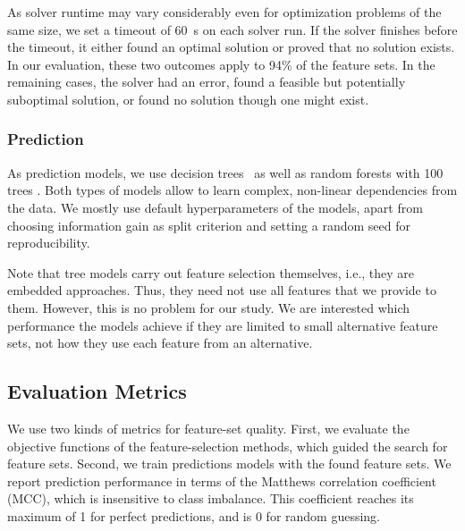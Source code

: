 \documentclass[conference]{IEEEtran}
\theoremstyle{definition}
\begin{document}
As solver runtime may vary considerably even for optimization problems of the same size, we set a timeout of 60~s on each solver run.
If the solver finishes before the timeout, it either found an optimal solution or proved that no solution exists.
In our evaluation, these two outcomes apply to 94\% of the feature sets.
In the remaining cases, the solver had an error, found a feasible but potentially suboptimal solution, or found no solution though one might exist.


\subsubsection{Prediction}
\label{sec:experimental-design:approaches:prediction}

As prediction models, we use decision trees~\cite{breiman1984classification} as well as random forests with 100 trees \cite{breiman2001random}.
Both types of models allow to learn complex, non-linear dependencies from the data.
We mostly use default hyperparameters of the models, apart from choosing information gain as split criterion and setting a random seed for reproducibility.

Note that tree models carry out feature selection themselves, i.e., they are embedded approaches.
Thus, they need not use all features that we provide to them.
However, this is no problem for our study.
We are interested which performance the models achieve if they are limited to small alternative feature sets, not how they use each feature from an alternative.

\subsection{Evaluation Metrics}
\label{sec:experimental-design:evaluation}

We use two kinds of metrics for feature-set quality.
First, we evaluate the objective functions of the feature-selection methods, which guided the search for feature sets.
Second, we train predictions models with the found feature sets.
We report prediction performance in terms of the Matthews correlation coefficient (MCC), which is insensitive to class imbalance.
This coefficient reaches its maximum of 1 for perfect predictions, and is 0 for random guessing.
\end{document}
